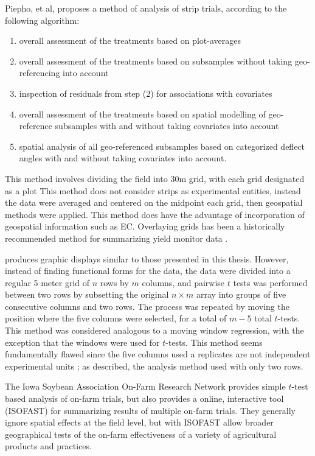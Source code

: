 \documentclass[phdcss]{SDSUThesis}
\begin{document}
Piepho, et al, \cite{piepho-11-2011} proposes a method of analysis of strip trials, according to the following algorithm:
\begin{enumerate}
  \item overall assessment of the treatments based on plot-averages
  \item overall assessment of the treatments based on subsamples without taking geo-referencing into account
  \item inspection of residuals from step (2) for associations with covariates
  \item overall assessment of the treatments based on spatial modelling of geo-reference subsamples with and without taking covariates into account
  \item spatial analysis of all geo-referenced subsamples based on categorized deflect angles with and without taking covariates into account.
\end{enumerate}

This method involves dividing the field into 30m grid, with each grid designated as a plot This method does not consider strips as experimental entities, instead the data were averaged and centered on the midpoint each grid, then geospatial methods were applied. This method does have the advantage of incorporation of geospatial information such as EC. Overlaying grids has been a historically recommended method for summarizing yield monitor data \cite{franzen-12-2008}.

\cite{lawes.r-03-2012} produces graphic displays similar to those presented in this thesis. However, instead of finding functional forms for the data, the data were divided into a regular 5 meter grid of $n$ rows by $m$ columns, and pairwise $t$ tests was performed between two rows by subsetting the original $n \times m$ array into groups of five consecutive columns and two rows. The process was repeated by moving the position where the five columns were selected, for a total of $m-5$ total $t$-tests. This method was considered analogous to a moving window regression, with the exception that the windows were used for $t$-tests. This method seems fundamentally flawed since the five columns used a replicates are not independent experimental units \cite{crawford-1997}; as described, the analysis method used with only two rows.

The Iowa Soybean Association On-Farm Research Network provides simple $t$-test based analysis of on-farm trials, but also provides a online, interactive tool (ISOFAST)\cite{laurent-11-2019} for summarizing results of multiple on-farm trials. They generally ignore spatial effects at the field level, but with ISOFAST allow broader geographical tests of the on-farm effectiveness of a variety of agricultural products and practices.
\end{document}
